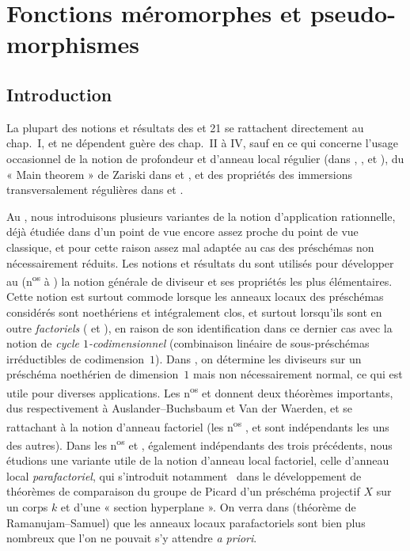 \section{Fonctions méromorphes et pseudo-morphismes}
\label{IV.20}

\setcounter{subsection}{-1}
\subsection{Introduction}

La plupart des notions et résultats des \textsection{} et 21 se rattachent directement au chap.~I, et ne dépendent guère des chap.~II à IV, sauf en ce qui concerne l'usage occasionnel de la notion de profondeur et d'anneau local régulier (dans , ,  et ), du « Main theorem » de Zariski dans  et , et des propriétés des immersions transversalement régulières dans  et .

Au , nous introduisons plusieurs variantes de la notion d'application rationnelle, déjà étudiée dans  d'un point de vue encore assez proche du point de vue classique, et pour cette raison assez mal adaptée au cas des préschémas non nécessairement réduits.
Les notions et résultats du  sont utilisés pour développer au  (n\textsuperscript{os}  à ) la notion générale de diviseur et ses propriétés les plus élémentaires.
Cette notion est surtout commode lorsque les anneaux locaux des préschémas considérés sont noethériens et intégralement clos, et surtout lorsqu'ils sont en outre \emph{factoriels} ( et ), en raison de son identification dans ce dernier cas avec la notion de \emph{cycle $1$-codimensionnel} (combinaison linéaire de sous-préschémas irréductibles de codimension~$1$).
Dans , on détermine les diviseurs sur un préschéma noethérien de dimension~$1$ mais non nécessairement normal, ce qui est utile pour diverses applications.
Les n\textsuperscript{os}  et  donnent deux théorèmes importants, dus respectivement à Auslander--Buchsbaum et Van der Waerden, et se rattachant à la notion d'anneau factoriel (les n\textsuperscript{os} ,  et  sont indépendants les uns des autres).
Dans les n\textsuperscript{os}  et , également indépendants des trois précédents, nous étudions une variante utile de la notion d'anneau local factoriel, celle d'anneau local \emph{parafactoriel}, qui s'introduit notamment~\cite{IV-41} dans le développement de théorèmes de comparaison du groupe de Picard d'un préschéma projectif $X$ sur un corps $k$ et d'une « section hyperplane ».
On verra dans  (théorème de Ramanujam--Samuel) que les anneaux locaux parafactoriels sont bien plus nombreux que l'on ne pouvait s'y attendre \emph{a priori}.

